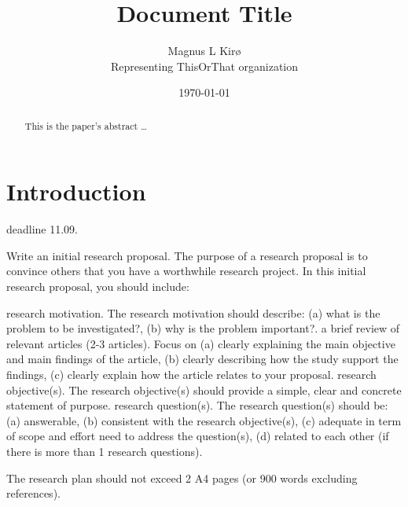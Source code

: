 \documentclass[12pt, a4paper]{article}
\title{
	Document Title
}
\author{
	Magnus L Kirø \\
	Representing ThisOrThat organization %
}
\date{\today}
\begin{document}
\maketitle
{}

\begin{abstract}
This is the paper's abstract \ldots
\end{abstract}

\section{Introduction}

deadline 11.09.


Write an initial research proposal. The purpose of a research proposal is to
convince others that you have a worthwhile research project. In this initial
research proposal, you should include:

    research motivation. The research motivation should describe: (a) what is
the problem to be investigated?, (b) why is the problem important?.
    a brief review of relevant articles (2-3 articles). Focus on (a) clearly
explaining the main objective and main findings of the article, (b) clearly
describing how the study support the findings, (c) clearly explain how the
article relates to your proposal.
    research objective(s). The research objective(s) should provide a simple,
clear and concrete statement of purpose.
    research question(s).  The research question(s) should be: (a) answerable,
(b) consistent with the research objective(s), (c) adequate in term of scope and
effort need to address the question(s), (d) related to each other (if there is
more than 1 research questions).

The research plan should not exceed 2 A4 pages (or 900 words excluding
references).
\end{document}
